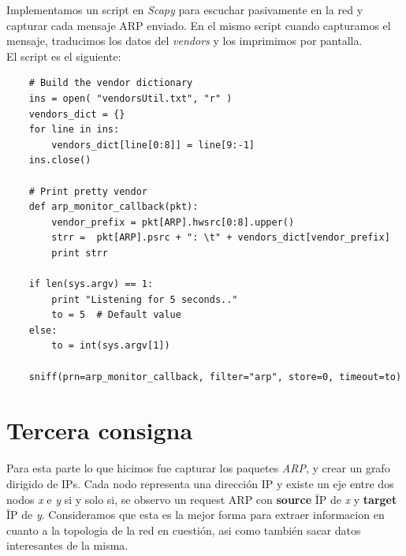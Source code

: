 \documentclass[a4paper]{article}
\begin{document}
Implementamos un script en \textit{Scapy} para escuchar pasivamente en la red y capturar cada mensaje ARP enviado. En el mismo script cuando capturamos el mensaje, traducimos los datos del \textit{vendors} y los imprimimos por pantalla.\\

El script es el siguiente:

\begin{verbatim}
	# Build the vendor dictionary
	ins = open( "vendorsUtil.txt", "r" )
	vendors_dict = {}
	for line in ins:
	    vendors_dict[line[0:8]] = line[9:-1] 
	ins.close()

	# Print pretty vendor
	def arp_monitor_callback(pkt):
		vendor_prefix = pkt[ARP].hwsrc[0:8].upper()
		strr =  pkt[ARP].psrc + ": \t" + vendors_dict[vendor_prefix]
		print strr

	if len(sys.argv) == 1:
		print "Listening for 5 seconds.."
		to = 5  # Default value
	else:
		to = int(sys.argv[1]) 

	sniff(prn=arp_monitor_callback, filter="arp", store=0, timeout=to)
\end{verbatim}

\newpage

\section{Tercera consigna}

Para esta parte lo que hicimos fue capturar los paquetes \textit{ARP}, y crear un grafo dirigido de IPs. Cada nodo representa una dirección IP y existe un eje entre dos nodos \textit{x} e \textit{y} si y solo si, se observo un request ARP con \textbf{source} \= IP de \textit{x} y \textbf{target} \= IP de \textit{y}. 
 Consideramos que esta es la mejor forma para extraer informacion en cuanto a la topologia de la red en cuestión, asi como también sacar datos interesantes de la misma. \\
 
\end{document}
